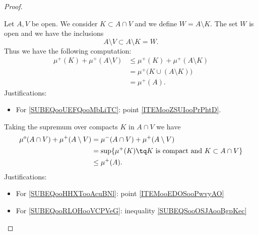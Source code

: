 \begin{proof}
\begin{subproof}
		Let \( A,V\) be open. We consider \( K\subset A\cap V\) and we define \( W=A\setminus K\). The set \( W\) is open and we have the inclusions
		\begin{equation}
			A\setminus V\subset A\setminus K=W.
		\end{equation}
		Thus we have the following computation:
		\begin{subequations}        \label{SUBEQSooOSJAooBgpKec}
			\begin{align}
				\mu^+(K)+\mu^+(A\setminus V) & \leq \mu^+(K)+\mu^+(A\setminus K)                                      \\
				                             & =\mu^+\big( K\cup (A\setminus K) \big)     \label{SUBEQooUEFQooMbLiTC} \\
				                             & =\mu^+(A).
			\end{align}
		\end{subequations}
		Justifications:
		\begin{itemize}
			\item For \eqref{SUBEQooUEFQooMbLiTC}: point \ref{ITEMooZSUIooPrPhtD}.
		\end{itemize}
		Taking the supremum over compacts \( K \) in \( A\cap V\) we have
		\begin{subequations}
			\begin{align}
				\mu^o(A\cap V)+\mu^+(A\setminus V) & =\mu^-(A\cap V)+\mu^+(A\setminus V)      \label{SUBEQooHHXTooAcuBNl}      \\
				                                   & =\sup\{ \mu^+(K)\tq \text{\( K\) is compact and \( K\subset A\cap V\)} \} \\
				                                   & \leq \mu^+(A).     \label{SUBEQooRLOHooVCPVeG}
			\end{align}
		\end{subequations}
		Justifications:
		\begin{itemize}
			\item For \eqref{SUBEQooHHXTooAcuBNl}: point \ref{ITEMooEDOSooPwvyAO}
			\item For \eqref{SUBEQooRLOHooVCPVeG}: inequality \eqref{SUBEQSooOSJAooBgpKec}
		\end{itemize}

		        \label{ITEMooHQPDooPEsgYN}


\end{subproof}
\end{proof}
